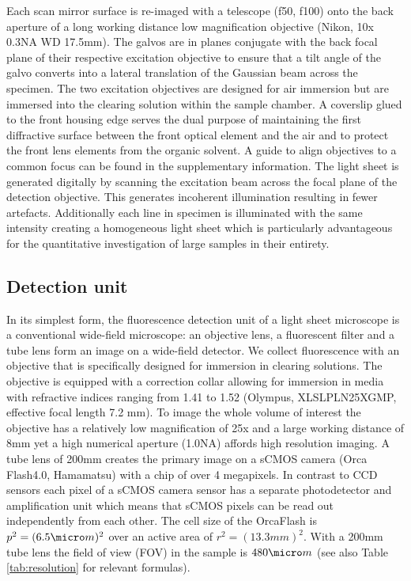 \documentclass[12pt]{spieman}  %
\begin{document}
Each scan mirror surface is re-imaged with a telescope (f50, f100) onto the back aperture of a long working distance low magnification objective (Nikon, 10x 0.3NA WD 17.5mm).  The galvos are in planes conjugate with the back focal plane of their respective excitation objective to ensure that a tilt angle of the galvo converts into a lateral translation of the Gaussian beam across the specimen. The two excitation objectives are designed for air immersion but are immersed into the clearing solution within the sample chamber. A coverslip glued to the front housing edge serves the dual purpose of maintaining the first diffractive surface between the front optical element and the air and to protect the front lens elements from the organic solvent. A guide to align objectives to a common focus can be found in the supplementary information. The light sheet is generated digitally\cite{Keller2008a,Keller2008b} by scanning the excitation beam across the focal plane of the detection objective. This generates incoherent illumination resulting in fewer artefacts. %
Additionally each line in specimen is illuminated with the same intensity creating a homogeneous light sheet which is particularly advantageous for the quantitative investigation of large samples in their entirety.

\subsection{Detection unit}
			
In its simplest form, the fluorescence detection unit of a light sheet microscope is a conventional wide-field microscope: an objective lens, a fluorescent filter and a tube lens form an image on a wide-field detector. We collect fluorescence with an objective that is specifically designed for immersion in clearing solutions. The objective is equipped with a correction collar allowing for immersion in media with refractive indices ranging from 1.41 to 1.52 (Olympus, XLSLPLN25XGMP, effective focal length 7.2 mm). To image the whole volume of interest the objective has a relatively low magnification of 25x and a large working distance of 8mm yet a high numerical aperture (1.0NA) affords high resolution imaging. A tube lens of 200mm creates the primary image on a sCMOS camera (Orca Flash4.0, Hamamatsu) with a chip of over 4 megapixels. In contrast to CCD sensors each pixel of a sCMOS camera sensor has a separate photodetector and amplification unit which means that sCMOS pixels can be read out independently from each other. The cell size of the OrcaFlash is $p^2= (6.5\micro m)^2$ over an active area of $r^2= (13.3mm)^2$. With a 200mm tube lens the field of view (FOV) in the sample is $480\micro m$ (see also Table \ref{tab:resolution} for relevant formulas). 
\end{document}

